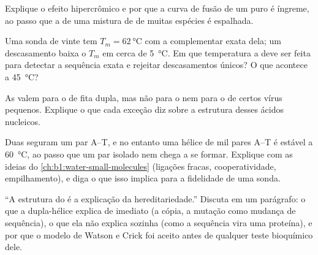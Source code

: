 \begin{exercise}[$\star\star$]\label{exo:b1:nucleic-acids:8}
Explique o efeito hipercrômico e por que a curva de fusão de um  puro
é íngreme, ao passo que a de uma mistura de  de muitas espécies é
espalhada.
\end{exercise}

\begin{exercise}[$\star\star$]\label{exo:b1:nucleic-acids:9}
Uma sonda de vinte  tem $T_m = \qty{62}{\celsius}$ com a
complementar exata dela; um descasamento baixa o $T_m$ em cerca de
\qty{5}{\celsius}. Em que temperatura a  deve ser feita para
detectar a sequência exata e rejeitar descasamentos únicos? O que
acontece a \qty{45}{\celsius}?
\end{exercise}

\begin{exercise}[$\star\star\star$]\label{exo:b1:nucleic-acids:10}
As  valem para o  de fita dupla, mas não para o 
nem para o  de certos vírus pequenos. Explique o que cada exceção diz
sobre a estrutura desses ácidos nucleicos.
\end{exercise}

\begin{exercise}[$\star\star\star$]\label{exo:b1:nucleic-acids:11}
Duas  seguram um par A--T, e no entanto uma hélice
de mil pares A--T é estável a \qty{60}{\celsius}, ao passo que um par
isolado nem chega a se formar. Explique com as ideias do
\cref{ch:b1:water-small-molecules} (ligações fracas, cooperatividade,
empilhamento), e diga o que isso implica para a fidelidade de uma sonda.
\end{exercise}

\begin{exercise}[$\star\star\star$]\label{exo:b1:nucleic-acids:12}
``A estrutura do  é a explicação da hereditariedade.'' Discuta em um
parágrafo: o que a dupla-hélice explica de imediato (a cópia, a mutação
como mudança de sequência), o que ela não explica sozinha (como a
sequência vira uma proteína), e por que o modelo de Watson e Crick foi
aceito antes de qualquer teste bioquímico dele.
\end{exercise}


